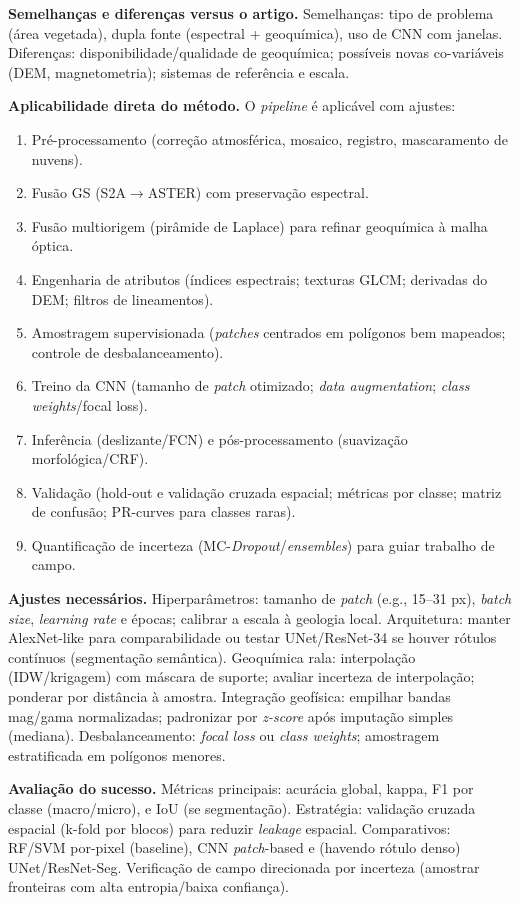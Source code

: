 \documentclass[12pt,a4paper]{article}
\begin{document}
\textbf{Semelhanças e diferenças versus o artigo.} Semelhanças: tipo de problema (área vegetada), dupla fonte (espectral + geoquímica), uso de CNN com janelas. Diferenças: disponibilidade/qualidade de geoquímica; possíveis novas co-variáveis (DEM, magnetometria); sistemas de referência e escala.

\textbf{Aplicabilidade direta do método.} O \emph{pipeline} é aplicável com ajustes:
\begin{enumerate}[leftmargin=1.2cm]
  \item Pré-processamento (correção atmosférica, mosaico, registro, mascaramento de nuvens).
  \item Fusão GS (S2A$\rightarrow$ASTER) com preservação espectral.
  \item Fusão multiorigem (pirâmide de Laplace) para refinar geoquímica à malha óptica.
  \item Engenharia de atributos (índices espectrais; texturas GLCM; derivadas do DEM; filtros de lineamentos).
  \item Amostragem supervisionada (\emph{patches} centrados em polígonos bem mapeados; controle de desbalanceamento).
  \item Treino da CNN (tamanho de \emph{patch} otimizado; \emph{data augmentation}; \emph{class weights}/focal loss).
  \item Inferência (deslizante/FCN) e pós-processamento (suavização morfológica/CRF).
  \item Validação (hold-out e validação cruzada espacial; métricas por classe; matriz de confusão; PR-curves para classes raras).
  \item Quantificação de incerteza (MC-\emph{Dropout}/\emph{ensembles}) para guiar trabalho de campo.
\end{enumerate}

\textbf{Ajustes necessários.} Hiperparâmetros: tamanho de \emph{patch} (e.g., 15--31 px), \emph{batch size}, \emph{learning rate} e épocas; calibrar a escala à geologia local. Arquitetura: manter AlexNet-like para comparabilidade ou testar UNet/ResNet-34 se houver rótulos contínuos (segmentação semântica). Geoquímica rala: interpolação (IDW/krigagem) com máscara de suporte; avaliar incerteza de interpolação; ponderar por distância à amostra. Integração geofísica: empilhar bandas mag/gama normalizadas; padronizar por \emph{z-score} após imputação simples (mediana). Desbalanceamento: \emph{focal loss} ou \emph{class weights}; amostragem estratificada em polígonos menores.

\textbf{Avaliação do sucesso.} Métricas principais: acurácia global, kappa, F1 por classe (macro/micro), e IoU (se segmentação). Estratégia: validação cruzada espacial (k-fold por blocos) para reduzir \emph{leakage} espacial. Comparativos: RF/SVM por-pixel (baseline), CNN \emph{patch}-based e (havendo rótulo denso) UNet/ResNet-Seg. Verificação de campo direcionada por incerteza (amostrar fronteiras com alta entropia/baixa confiança).
\end{document}
